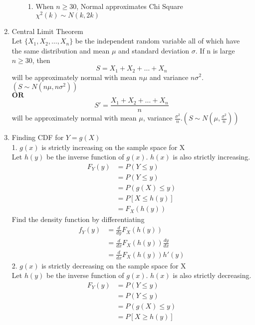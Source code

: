 \documentclass[10pt]{article}
\begin{document}
\begin{multicols}{2}
\begin{enumerate}
\begin{enumerate}
\begin{enumerate}
					\item When $n \ge 30$, Normal approximates Chi Square\\
					$\chi^2(k) \sim N(k,2k)$
				\end{enumerate}
			\end{enumerate}
			\item Central Limit Theorem\\
			Let $\{ X_1, X_2, \dots, X_n \}$ be the independent random variable all of which have the same distribution and mean $\mu$ and standard deviation $\sigma$. If n is large $n \ge 30$, then 
			$$ S = X_1 + X_2 + \dots + X_n$$
			will be approximately normal with mean $n\mu$ and variance $n\sigma^2$. $(S\sim N(n\mu, n\sigma^2))$\\
			$\textbf{OR}$\\
			$$S' = \frac{X_1 + X_2 + \dots + X_n}{n}$$
			will be approximately normal with mean $\mu$, variance $\frac{\sigma^2}{n}$.$(S\sim N(\mu, \frac{\sigma^2}{n}))$\\
			\item Finding CDF for $Y = g(X)$\\
			1. $g(x)$ is strictly increasing on the sample space for X\\
			Let $h(y)$ be the inverse function of $g(x)$. $h(x)$ is also strictly increasing.
			\begin{align*}
				F_Y(y) &= P(Y\le y)\\
				&= P(Y\le y)\\
				&= P(g(X) \le y)\\
				&= P[X \le h(y)]\\
				&= F_X(h(y))
			\end{align*}
			Find the density function by differentiating
			\begin{align*}
				f_Y(y) &= \frac{d}{dy}F_X(h(y))\\
				&= \frac{d}{dx}F_X(h(y))\frac{dy}{dx}\\
				&= \frac{d}{dx}F_X(h(y))h'(y)
			\end{align*}
			2. $g(x)$ is strictly decreasing on the sample space for X\\
			Let $h(y)$ be the inverse function of $g(x)$. $h(x)$ is also strictly decreasing.\\
			\begin{align*}
				F_Y(y) &= P(Y\le y)\\
				&= P(Y\le y)\\
				&= P(g(X) \le y)\\
				&= P[X \ge h(y)]\\

\end{align*}
\end{enumerate}
\end{multicols}
\end{document}
